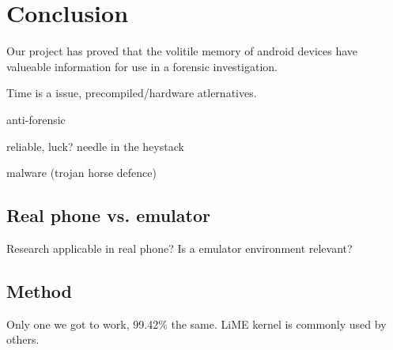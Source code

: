 \section{Conclusion}
Our project has proved that the volitile memory of android devices have valueable information for use in a forensic investigation.

Time is a issue, precompiled/hardware atlernatives.

anti-forensic

reliable, luck? needle in the heystack

malware (trojan horse defence)


\subsection{Real phone vs. emulator}
Research applicable in real phone? Is a emulator environment relevant?


\subsection{Method}
Only one we got to work, 99.42\% the same.
LiME kernel is commonly used by others.



